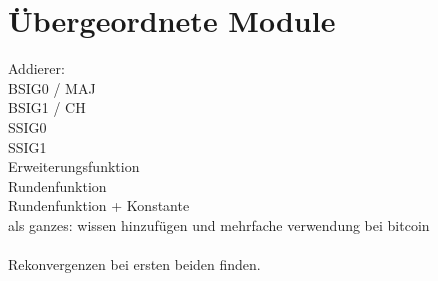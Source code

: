 \section{Übergeordnete Module}
\label{sec:knf:module}


Addierer:\\
BSIG0 / MAJ\\
BSIG1 / CH\\
SSIG0\\
SSIG1\\
Erweiterungsfunktion\\
Rundenfunktion\\
Rundenfunktion + Konstante\\
 als ganzes: wissen hinzufügen und mehrfache verwendung bei bitcoin\\
~\\
Rekonvergenzen bei ersten beiden finden.
